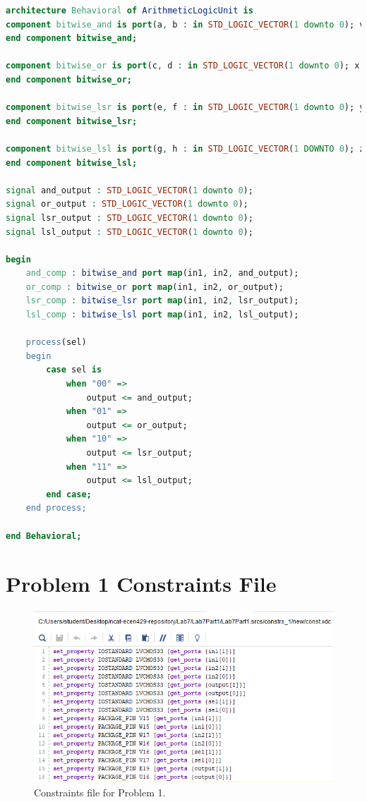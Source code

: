 \documentclass[11pt]{article}
\begin{document}
\begin{appendices}
\begin{lstlisting}[language=VHDL]
architecture Behavioral of ArithmeticLogicUnit is
component bitwise_and is port(a, b : in STD_LOGIC_VECTOR(1 downto 0); v : out STD_LOGIC_VECTOR(1 downto 0));
end component bitwise_and;

component bitwise_or is port(c, d : in STD_LOGIC_VECTOR(1 downto 0); x : out STD_LOGIC_VECTOR(1 downto 0));
end component bitwise_or;

component bitwise_lsr is port(e, f : in STD_LOGIC_VECTOR(1 downto 0); y : out STD_LOGIC_VECTOR(1 downto 0));
end component bitwise_lsr;

component bitwise_lsl is port(g, h : in STD_LOGIC_VECTOR(1 DOWNTO 0); z : out STD_LOGIC_VECTOR(1 downto 0));
end component bitwise_lsl;

signal and_output : STD_LOGIC_VECTOR(1 downto 0);
signal or_output : STD_LOGIC_VECTOR(1 downto 0);
signal lsr_output : STD_LOGIC_VECTOR(1 downto 0);
signal lsl_output : STD_LOGIC_VECTOR(1 downto 0);

begin
    and_comp : bitwise_and port map(in1, in2, and_output);
    or_comp : bitwise_or port map(in1, in2, or_output);
    lsr_comp : bitwise_lsr port map(in1, in2, lsr_output);
    lsl_comp : bitwise_lsl port map(in1, in2, lsl_output);
    
    process(sel)
    begin
        case sel is
            when "00" =>
                output <= and_output;
            when "01" =>
                output <= or_output;
            when "10" =>
                output <= lsr_output;
            when "11" =>
                output <= lsl_output;
        end case;
    end process;                

end Behavioral;
\end{lstlisting}

\section{Problem 1 Constraints File}
\begin{center}
\begin{figure}[H]
	\includegraphics[scale=1]{./images/Lab7Part1Const.png}
	\caption{\label{fig:Prob1Const}Constraints file for Problem 1.}
\end{figure}
\end{center}


\end{appendices}
\end{document}

